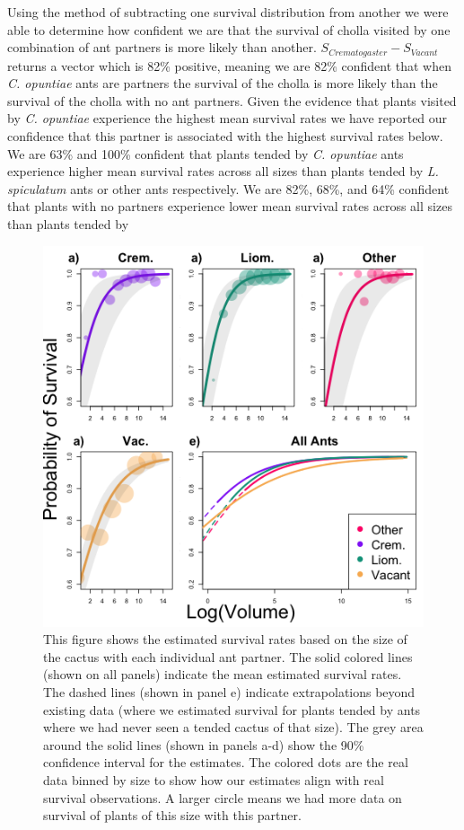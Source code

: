 \documentclass[11pt]{article}
\begin{document}
Using the method of subtracting one survival distribution from another we were able to determine how confident we are that the survival of cholla visited by one combination of ant partners is more likely than another. 
$S_{Crematogaster} - S_{Vacant}$ returns a vector which is 82\% positive, meaning we are 82\% confident that when \textit{C. opuntiae} ants are partners the survival of the cholla is more likely than the survival of the cholla with no ant partners.
Given the evidence that plants visited by \textit{C. opuntiae} experience the highest mean survival rates we have reported our confidence that this partner is associated with the highest survival rates below. 
We are 63\% and 100\% confident that plants tended by \textit{C. opuntiae} ants experience higher mean survival rates across all sizes than plants tended by \textit{L. spiculatum} ants or other ants respectively.
We are 82\%, 68\%, and 64\% confident that plants with no partners experience lower mean survival rates across all sizes than plants tended by 

\begin{figure}[H]
\includegraphics[width=0.95\linewidth]{Figures/SurvivalPlot.png}
\caption{This figure shows the estimated survival rates based on the size of the cactus with each individual ant partner. The solid colored lines (shown on all panels) indicate the mean estimated survival rates. The dashed lines (shown in panel e) indicate extrapolations beyond existing data (where we estimated survival for plants tended by ants where we had never seen a tended cactus of that size). The grey area around the solid lines (shown in panels a-d) show the 90\% confidence interval for the estimates. The colored dots are the real data binned by size to show how our estimates align with real survival observations. A larger circle means we had more data on survival of plants of this size with this partner.}
\label{fig:Surv}
\end{figure}
\end{document}
